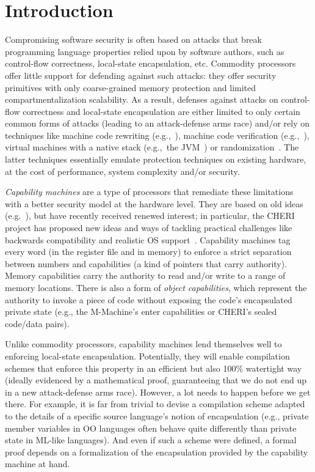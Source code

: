 \documentclass[compsoc,conference,letterpaper,fleqn]{IEEEtran}
\begin{document}
\section{Introduction}
\label{sec:introduction}

Compromising software security is often based on attacks that break programming
language properties relied upon by software authors, such as control-flow
correctness, local-state encapsulation, etc. Commodity processors offer little
support for defending against such attacks: they offer security primitives with
only coarse-grained memory protection and limited compartmentalization
scalability. As a result, defenses against attacks on control-flow correctness
and local-state encapsulation are either limited to only certain common forms of
attacks (leading to an attack-defense arms race) and/or rely on techniques like
machine code rewriting
(e.g.,~\citet{wahbe_efficient_1993,abadi_control-flow_2005}), machine code
verification (e.g.,~\citet{morrisett_system_1999}), virtual machines with a
native stack (e.g.,~the JVM~\citep{lindholm_java_2014}) or
randomization~\citep{forrest_building_1997}. The latter techniques essentially
emulate protection techniques on existing hardware, at the cost of performance,
system complexity and/or security.

\emph{Capability machines} are a type of processors that
remediate these limitations with a better security model at
the hardware level. They are based on old ideas
(e.g.~\citet{Carter:1994:HSF:195473.195579,Dennis:1966:PSM:365230.365252,shapiro_eros:_1999}),
but have recently received renewed interest; in particular, the CHERI
project has proposed new ideas and ways of tackling practical
challenges like backwards compatibility and realistic OS
support~\citep{Watson2015Cheri,Woodruff:2014:CCM:2665671.2665740}. Capability
machines tag every word (in the register file and in memory) to
enforce a strict separation between numbers and capabilities (a kind
of pointers that carry authority). Memory capabilities carry
the authority to read and/or write to a range of memory
locations. There is also a form of \emph{object capabilities}, which represent the
authority to invoke a piece of code without exposing the code's
encapsulated private state (e.g., the M-Machine's enter capabilities or
CHERI's sealed code/data pairs).

Unlike commodity processors, capability machines lend themselves well to
enforcing local-state encapsulation. Potentially, they will enable compilation
schemes that enforce this property in an efficient but also 100\% watertight way
(ideally evidenced by a mathematical proof, guaranteeing that we do not end up
in a new attack-defense arms race). However, a lot needs to happen before we get
there. For example, it is far from trivial to devise a compilation scheme
adapted to the details of a specific source language's notion of encapsulation
(e.g., private member variables in OO languages often behave quite differently
than private state in ML-like languages). And even if such a scheme were
defined, a formal proof depends on a formalization of the encapsulation provided
by the capability machine at hand.
\end{document}
